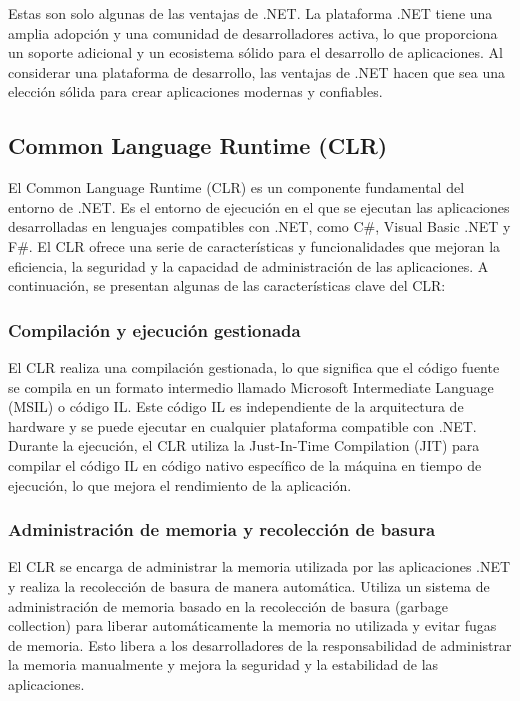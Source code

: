 \documentclass[executivepaper]{article}
\begin{document}
Estas son solo algunas de las ventajas de .NET. La plataforma .NET tiene una amplia adopción y una comunidad de desarrolladores activa, lo que proporciona un soporte adicional y un ecosistema sólido para el desarrollo de aplicaciones. Al considerar una plataforma de desarrollo, las ventajas de .NET hacen que sea una elección sólida para crear aplicaciones modernas y confiables.

\subsection{Common Language Runtime (CLR)}

El Common Language Runtime (CLR) es un componente fundamental del entorno de .NET. Es el entorno de ejecución en el que se ejecutan las aplicaciones desarrolladas en lenguajes compatibles con .NET, como C\#, Visual Basic .NET y F\#. El CLR ofrece una serie de características y funcionalidades que mejoran la eficiencia, la seguridad y la capacidad de administración de las aplicaciones. A continuación, se presentan algunas de las características clave del CLR:

\subsubsection*{Compilación y ejecución gestionada}
El CLR realiza una compilación gestionada, lo que significa que el código fuente se compila en un formato intermedio llamado Microsoft Intermediate Language (MSIL) o código IL. Este código IL es independiente de la arquitectura de hardware y se puede ejecutar en cualquier plataforma compatible con .NET. Durante la ejecución, el CLR utiliza la Just-In-Time Compilation (JIT) para compilar el código IL en código nativo específico de la máquina en tiempo de ejecución, lo que mejora el rendimiento de la aplicación.

\subsubsection*{Administración de memoria y recolección de basura}
El CLR se encarga de administrar la memoria utilizada por las aplicaciones .NET y realiza la recolección de basura de manera automática. Utiliza un sistema de administración de memoria basado en la recolección de basura (garbage collection) para liberar automáticamente la memoria no utilizada y evitar fugas de memoria. Esto libera a los desarrolladores de la responsabilidad de administrar la memoria manualmente y mejora la seguridad y la estabilidad de las aplicaciones.
\end{document}
